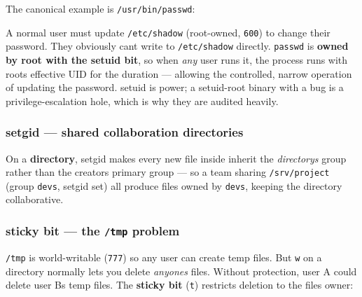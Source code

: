 \documentclass[11pt]{article}
\newenvironment{Shaded}{\begin{snugshade}}{\end{snugshade}}
\newcommand{\AttributeTok}[1]{\textcolor[rgb]{0.16,0.50,0.73}{#1}}
\newcommand{\ExtensionTok}[1]{\textcolor[rgb]{0.00,0.60,1.00}{\textbf{#1}}}
\newcommand{\NormalTok}[1]{\textcolor[rgb]{0.81,0.81,0.76}{#1}}
\newcommand{\StringTok}[1]{\textcolor[rgb]{0.96,0.31,0.31}{#1}}
\begin{document}
The canonical example is \texttt{/usr/bin/passwd}:


\begin{Shaded}
\end{Shaded}

A normal user must update \texttt{/etc/shadow} (root-owned, \texttt{600}) to change their password. They obviously can\textquotesingle t write to \texttt{/etc/shadow} directly. \texttt{passwd} is \textbf{owned by root with the setuid bit}, so when \emph{any} user runs it, the process runs with root\textquotesingle s effective UID for the duration --- allowing the controlled, narrow operation of updating the password. setuid is power; a setuid-root binary with a bug is a privilege-escalation hole, which is why they are audited heavily.

\subsubsection{setgid --- shared collaboration directories}\label{setgid--shared-collaboration-directories}

On a \textbf{directory}, setgid makes every new file inside inherit the \emph{directory\textquotesingle s} group rather than the creator\textquotesingle s primary group --- so a team sharing \texttt{/srv/project} (group \texttt{devs}, setgid set) all produce files owned by \texttt{devs}, keeping the directory collaborative.

\subsubsection{\texorpdfstring{sticky bit --- the \texttt{/tmp} problem}{sticky bit --- the /tmp problem}}\label{sticky-bit--the-tmp-problem}

\texttt{/tmp} is world-writable (\texttt{777}) so any user can create temp files. But \texttt{w} on a directory normally lets you delete \emph{anyone\textquotesingle s} files. Without protection, user A could delete user B\textquotesingle s temp files. The \textbf{sticky bit} (\texttt{t}) restricts deletion to the file\textquotesingle s owner:
\end{document}
